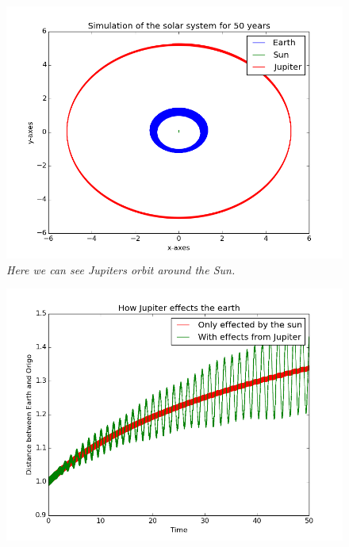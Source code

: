 \documentclass[a4paper,12pt, english]{article}
\begin{document}
\begin{figure}[h!]
  \centering
   	 \includegraphics[scale=0.5]{Sun_earth_jupiter.png}
  \caption{\textit{Here we can see Jupiters orbit around the Sun.}}
\end{figure}




\begin{figure}[h!]
  \centering
   	 \includegraphics[scale=0.5]{Effect_of_Jupiter.png}
  \caption{\textit{}}
\end{figure}
\end{document}
